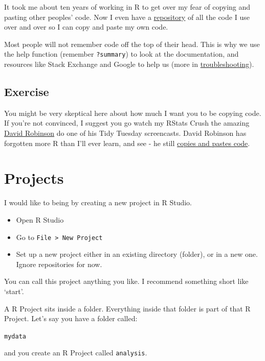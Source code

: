 \documentclass[
]{book}
\begin{document}
It took me about ten years of working in R to get over my fear of copying and pasting other peoples' code. Now I even have a \href{https://github.com/jillymackay/commoncode}{repository} of all the code I use over and over so I can copy and paste my own code.

Most people will not remember code off the top of their head. This is why we use the help function (remember \texttt{?summary}) to look at the documentation, and resources like Stack Exchange and Google to help us (more in \protect\hyperlink{trouble}{troubleshooting}).

\hypertarget{ex_tidytuesday}{%
\subsection{Exercise}\label{ex_tidytuesday}}

You might be very skeptical here about how much I want you to be copying code. If you're not convinced, I suggest you go watch my RStats Crush the amazing \href{https://twitter.com/drob}{David Robinson} do one of his Tidy Tuesday screencasts. David Robinson has forgotten more R than I'll ever learn, and see - he still \href{https://www.youtube.com/channel/UCeiiqmVK07qhY-wvg3IZiZQ}{copies and pastes code}.

\hypertarget{projects}{%
\section{Projects}\label{projects}}

I would like to being by creating a new project in R Studio.

\begin{itemize}
\item
  Open R Studio
\item
  Go to \texttt{File\ \textgreater{}\ New\ Project}
\item
  Set up a new project either in an existing directory (folder), or in a new one. Ignore repositories for now.
\end{itemize}

You can call this project anything you like. I recommend something short like `start'.

A R Project sits inside a folder. Everything inside that folder is part of that R Project. Let's say you have a folder called:

\texttt{mydata}

and you create an R Project called \texttt{analysis}.
\end{document}
